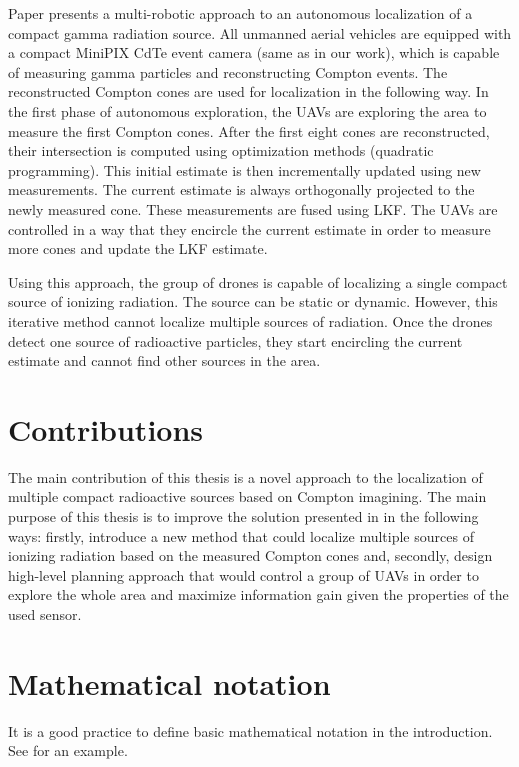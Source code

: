 Paper \cite{baca2021gamma} presents a multi-robotic approach to an autonomous localization of a compact gamma radiation source. 
All unmanned aerial vehicles are equipped with a compact MiniPIX CdTe event camera (same as in our work), which is capable of measuring gamma particles and reconstructing Compton events. 
The reconstructed Compton cones are used for localization in the following way.
In the first phase of autonomous exploration, the \ac{UAV}s are exploring the area to measure the first Compton cones. 
After the first eight cones are reconstructed, their intersection is computed using optimization methods (quadratic programming). 
This initial estimate is then incrementally updated using new measurements. 
The current estimate is always orthogonally projected to the newly measured cone. 
These measurements are fused using \ac{LKF}. 
The \ac{UAV}s are controlled in a way that they encircle the current estimate in order to measure more cones and update the \ac{LKF} estimate.

Using this approach, the group of drones is capable of localizing a single compact source of ionizing radiation. 
The source can be static or dynamic. 
However, this iterative method cannot localize multiple sources of radiation.
Once the drones detect one source of radioactive particles, they start encircling the current estimate and cannot find other sources in the area.


\section{Contributions}
The main contribution of this thesis is a novel approach to the localization of multiple compact radioactive sources based on Compton imagining.
The main purpose of this thesis is to improve the solution presented in \cite{baca2021gamma} in the following ways: firstly, introduce a new method that could localize multiple sources of ionizing radiation based on the measured Compton cones and, 
secondly, 
design high-level planning approach that would control a group of \ac{UAV}s in order to explore the whole area and maximize information gain given the properties of the used sensor.

\section{Mathematical notation}

It is a good practice to define basic mathematical notation in the introduction.
See  for an example.

